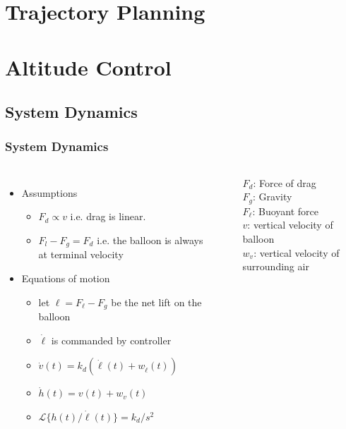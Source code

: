 \documentclass[10pt,mathserif]{beamer}
\begin{document}
\section{Trajectory Planning}



\section{Altitude Control}
\subsection{System Dynamics}

\begin{frame}
\frametitle{System Dynamics}
\begin{columns}
\begin{itemize}\itemsep=12pt
\item Assumptions
\vspace*{0.5em}
\begin{itemize}
\item $F_d \propto v$ i.e. drag is linear.
\item $F_l - F_g = F_d$ i.e. the balloon is always at terminal velocity 
\end{itemize}
\item Equations of motion
\vspace*{0.5em}
\begin{itemize}
\item let $\ell = F_{\ell} - F_g$ be the net lift on the balloon
\item $\dot \ell$ is commanded by controller
\item $\dot v(t) = k_d (\dot \ell(t) + w_{\dot \ell} (t))$
\item $\dot h(t) = v(t) +  w_v(t)$
\item $\mathcal{L}\{h(t) / \dot \ell (t) \} = k_{d} / s^2$
\end{itemize}
\end{itemize}


\begin{center}
\end{center}
$F_d$: Force of drag\\
$F_g$: Gravity\\
$F_{\ell}$: Buoyant force\\
$v$: vertical velocity of balloon\\
$w_v$: vertical velocity of surrounding air
\end{columns}
\end{frame}
\end{document}
